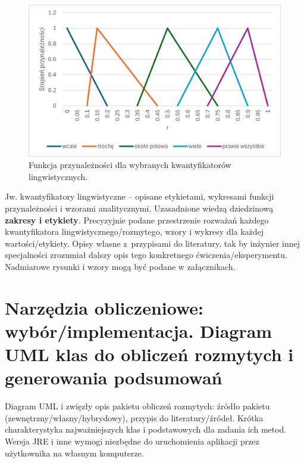 \documentclass{article}
\begin{document}
        \begin{figure}[H]
    \centering
    \includegraphics[width=\textwidth]{img/a.png}
    \caption{Funkcja przynależności dla wybranych kwantyfikatorów lingwistycznych.}
    \end{figure}


Jw. kwantyfikatory lingwistyczne -- opisane etykietami, wykresami funkcji
przynależności i wzorami analitycznymi. Uzasadnione wiedzą dziedzinową  
{\bf zakresy i etykiety}. Precyzyjnie podane przestrzenie rozważań każdego kwantyfikatora 
lingwistycznego/rozmytego, wzory i wykresy dla każdej wartości/etykiety. Opisy własne z~przypisami do literatury, tak by inżynier innej specjalności zrozumiał dalszy
opis tego konkretnego ćwiczenia/eksperymentu. 
Nadmiarowe rysunki i wzory mogą być podane w załącznikach.  

\section{Narzędzia obliczeniowe: wybór/implementacja. Diagram UML klas do obliczeń rozmytych i generowania podsumowań}

Diagram UML i zwięzły opis pakietu obliczeń rozmytych: źródło pakietu
(zewnętrzny/własny/hybrydowy), przypis do literatury/źródeł. Krótka charakterystyka
najważniejszych klas i podstawowych dla zadania ich metod. \\

Wersja JRE i inne wymogi niezbędne do uruchomienia aplikacji przez użytkownika na własnym komputerze. 
\end{document}
